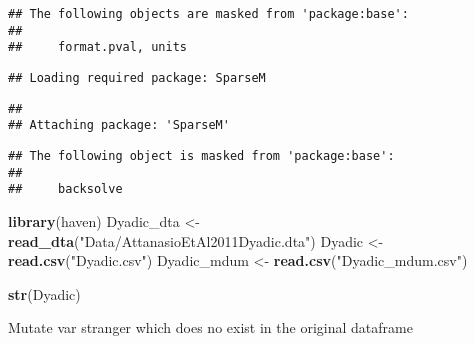 \documentclass[]{tufte-handout}
\newenvironment{Shaded}{\begin{snugshade}}{\end{snugshade}}
\newcommand{\KeywordTok}[1]{\textcolor[rgb]{0.13,0.29,0.53}{\textbf{#1}}}
\newcommand{\StringTok}[1]{\textcolor[rgb]{0.31,0.60,0.02}{#1}}
\newcommand{\OperatorTok}[1]{\textcolor[rgb]{0.81,0.36,0.00}{\textbf{#1}}}
\newcommand{\NormalTok}[1]{#1}
\begin{document}
\begin{verbatim}
## The following objects are masked from 'package:base':
## 
##     format.pval, units
\end{verbatim}

\begin{verbatim}
## Loading required package: SparseM
\end{verbatim}

\begin{verbatim}
## 
## Attaching package: 'SparseM'
\end{verbatim}

\begin{verbatim}
## The following object is masked from 'package:base':
## 
##     backsolve
\end{verbatim}

\begin{Shaded}
\begin{Highlighting}[]
\KeywordTok{library}\NormalTok{(haven)}
\NormalTok{Dyadic_dta <-}\StringTok{ }\KeywordTok{read_dta}\NormalTok{(}\StringTok{"Data/AttanasioEtAl2011Dyadic.dta"}\NormalTok{)}
\NormalTok{Dyadic <-}\StringTok{ }\KeywordTok{read.csv}\NormalTok{(}\StringTok{"Dyadic.csv"}\NormalTok{)}
\NormalTok{Dyadic_mdum <-}\StringTok{ }\KeywordTok{read.csv}\NormalTok{(}\StringTok{"Dyadic_mdum.csv"}\NormalTok{)}
\end{Highlighting}
\end{Shaded}

\begin{Shaded}
\end{Shaded}

\begin{Shaded}
\begin{Highlighting}[]
\KeywordTok{str}\NormalTok{(Dyadic)}
\end{Highlighting}
\end{Shaded}

Mutate var stranger which does no exist in the original dataframe

\begin{Shaded}
\end{Shaded}
\end{document}
